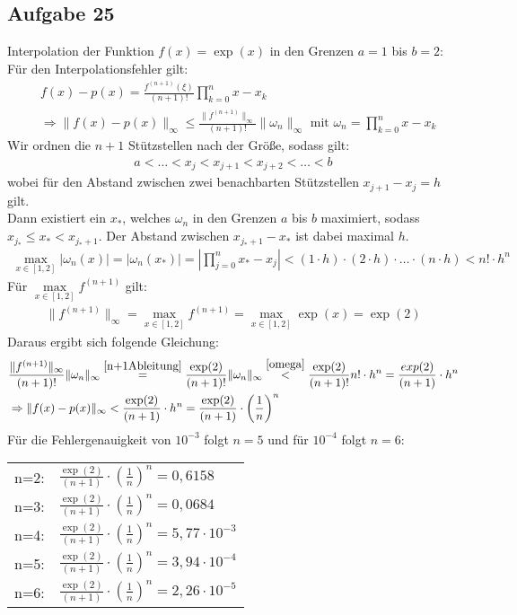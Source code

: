 \subsection*{Aufgabe 25}

Interpolation der Funktion $f(x)=\exp(x)$  in den Grenzen $a=1$ bis $b=2$:\\
\newline
Für den Interpolationsfehler gilt:
\begin{align*}
&f(x)-p(x)=\frac{f^{(n+1)}(\xi)}{(n+1)!}\prod_{k=0}^{n}x-x_k\\
&\Rightarrow \|f(x)-p(x)\|_\infty \le \frac{\|f^{(n+1)}\|_\infty}{(n+1)!} \|\omega_n\|_\infty \text{ mit } \omega_n=\prod_{k=0}^{n}x-x_k
\end{align*}
Wir ordnen die $n+1$ Stützstellen nach der Größe, sodass gilt:
\begin{align*}
a<\ldots<x_j<x_{j+1}<x_{j+2}<\ldots<b
\end{align*}
wobei für den Abstand zwischen zwei benachbarten Stützstellen $x_{j+1}-x_j=h$ gilt.\\
Dann existiert ein $x_*$, welches $\omega_n$ in den Grenzen $a$ bis $b$ maximiert,  sodass $x_{j_*}\le x_* < x_{j_*+1}$. Der Abstand zwischen  $x_{j_*+1}-x_*$ ist dabei maximal $h$.
\begin{align}\label{omega}
\max_{x \in [1,2]} |\omega_n(x)|=|\omega_n(x_*)|=\left|\prod_{j=0}^{n}x_*-x_j\right| < (1 \cdot h) \cdot (2 \cdot h) \cdot \ldots \cdot (n \cdot h)<n!\cdot h^n
\end{align}
Für $\underset{x \in [1,2]}{\max} f^{(n+1)}$ gilt:
\begin{align}\label{n+1Ableitung}
\|f^{(n+1)}\|_\infty=\max_{x \in [1,2]} f^{(n+1)} = \max_{x \in [1,2]} \exp(x)= \exp(2)
\end{align}
Daraus ergibt sich folgende Gleichung:
\begin{align*}
&\frac{\|f^{(n+1)}\|_\infty}{(n+1)!} \|\omega_n\|_\infty \overset{\eqref{n+1Ableitung}}{=} \frac{\exp(2)}{(n+1)!} \|\omega_n\|_\infty \overset{\eqref{omega}}{<} \frac{\exp(2)}{(n+1)!}n!\cdot h^n=\frac{exp(2)}{(n+1)}\cdot h^n\\
&\Rightarrow \|f(x)-p(x)\|_\infty < \frac{\exp(2)}{(n+1)}\cdot h^n=\frac{\exp(2)}{(n+1)}\cdot \left(\frac{1}{n}\right)^n
\end{align*}
Für die Fehlergenauigkeit von $10^{-3}$ folgt $ n= 5$ und für $10^{-4}$ folgt $n=6$:\\
\begin{tabular}{|c|l|}\hline
n=2: &$\frac{\exp(2)}{(n+1)}\cdot \left(\frac{1}{n}\right)^n=0,6158$\\
n=3: &$\frac{\exp(2)}{(n+1)}\cdot \left(\frac{1}{n}\right)^n=0,0684$\\
n=4: &$\frac{\exp(2)}{(n+1)}\cdot \left(\frac{1}{n}\right)^n=5,77\cdot 10^{-3}$\\
n=5: &$\frac{\exp(2)}{(n+1)}\cdot \left(\frac{1}{n}\right)^n=3,94 \cdot 10^{-4}$\\
n=6: &$\frac{\exp(2)}{(n+1)}\cdot \left(\frac{1}{n}\right)^n=2,26 \cdot 10^{-5}$\\\hline
\end{tabular}\\
